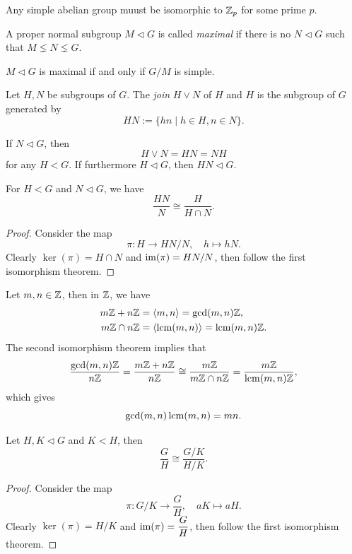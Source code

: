 \begin{proposition}
  Any simple abelian group muust be isomorphic to \(\mathbb{Z}_p\) for some prime \(p\).
\end{proposition}

\begin{definition}
  A proper normal subgroup \(M\lhd G\) is called \emph{maximal} if there is no \(N\lhd G\) such that \(M\lneq N\lneq G\).
\end{definition}

\begin{proposition}
  \(M\lhd G\) is maximal if and only if \(G/M\) is simple.
\end{proposition}

\begin{definition}
  Let \(H, N\) be subgroups of \(G\). The \emph{join} \(H\vee N\) of \(H\) and \(H\) is the subgroup of \(G\) generated by \[
    HN := \{hn\mid h\in H,n\in N\}.
  \]
\end{definition}

\begin{lemma}
  If \(N\lhd G\), then \[
    H\vee N = HN = NH
  \] for any \(H < G\). If furthermore \(H\lhd G\), then \(HN\lhd G\).
\end{lemma}

\begin{theorem}
  For \(H < G\) and \(N\lhd G\), we have \[
    \frac{HN}{N} \cong \frac{H}{H\cap N}.
  \]
\end{theorem}
\begin{proof}
  Consider the map \[
    \pi: H\longrightarrow HN/N, \quad
    h \longmapsto hN.
  \]
  Clearly \(\ker(\pi) = H\cap N\) and \(\operatorname{im}(\pi) = HN/N\), then follow the first isomorphism theorem.
\end{proof}

\begin{example}
  Let \(m,n\in\mathbb{Z}\), then in \(\mathbb{Z}\), we have \begin{align*}
    m\mathbb{Z} + n\mathbb{Z} &= \langle m,n\rangle = \gcd(m,n)\mathbb{Z}, \\
    m\mathbb{Z} \cap n\mathbb{Z} &= \langle\operatorname{lcm}(m,n)\rangle = \operatorname{lcm}(m,n)\mathbb{Z}.
  \end{align*}
  The second isomorphism theorem implies that \[
    \frac{\gcd(m,n)\mathbb{Z}}{n\mathbb{Z}}
    = \frac{m\mathbb{Z} + n\mathbb{Z}}{n\mathbb{Z}}
    \cong \frac{m\mathbb{Z}}{m\mathbb{Z} \cap n\mathbb{Z}}
    = \frac{m\mathbb{Z}}{\operatorname{lcm}(m,n)\mathbb{Z}},
  \] which gives \[
    \gcd(m,n)\operatorname{lcm}(m,n) = mn.
  \]
\end{example}

\begin{theorem}
  Let \(H,K\lhd G\) and \(K < H\), then \[
    \frac{G}{H} \cong \frac{G/K}{H/K}.
  \]
\end{theorem}
\begin{proof}
  Consider the map \[
    \pi: G/K \longrightarrow \dfrac{G}{H}, \quad
    aK \longmapsto aH.
  \]
  Clearly \(\ker(\pi) = H/K\) and \(\operatorname{im}(\pi) = \dfrac{G}{H}\), then follow the first isomorphism theorem.
\end{proof}

